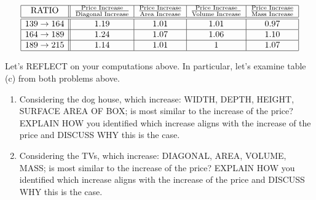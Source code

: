\documentclass[nooutcomes,noauthor]{ximera}
\begin{document}
\begin{question}
\begin{freeResponse}
\begin{enumerate}
\[      \begin{array}{|c||c|c|c|c|}
        \hline
        \text{RATIO} & \frac{\text{Price Increase}}{\text{Diagonal Increase}}  &  \frac{\text{Price Increase}}{\text{Area Increase}} &  \frac{\text{Price Increase}}{\text{Volume Increase}} &  \frac{\text{Price Increase}}{\text{Mass Increase}}\\ \hline\hline
        139 \to 164 &  1.19  & 1.01 & 1.01 & 0.97 \\ \hline
      164\to 189  & 1.24 & 1.07 & 1.06 & 1.10 \\ \hline
      189\to 215 & 1.14  & 1.01 & 1 &  1.07 \\ \hline
    \end{array}
      \]
      \end{enumerate}
  \end{freeResponse}
\end{question}




\begin{question}
  Let's REFLECT on your computations above. In particular, let's
  examine table (c) from both problems above.
  \begin{enumerate}
    \item Considering the dog house, which increase: WIDTH, DEPTH,
      HEIGHT, SURFACE AREA OF BOX; is most similar to the increase of
      the price? EXPLAIN HOW you identified which increase aligns with
      the increase of the price and DISCUSS WHY this is the case.
    \item Considering the TVs, which increase: DIAGONAL, AREA, VOLUME,
      MASS; is most similar to the increase of the price?  EXPLAIN HOW
      you identified which increase aligns with the increase of the
      price and DISCUSS WHY this is the case.
  \end{enumerate}
\end{question}
\end{document}
